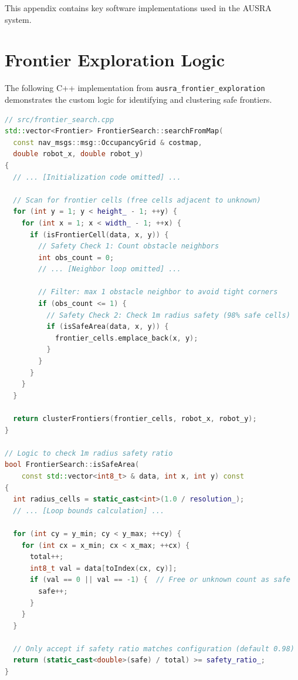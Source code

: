 This appendix contains key software implementations used in the AUSRA system.

\section{Frontier Exploration Logic}
\label{code:frontier_api}

The following C++ implementation from \texttt{ausra\_frontier\_exploration} demonstrates the custom logic for identifying and clustering safe frontiers.

\begin{lstlisting}[language=C++, caption={Frontier Search and Safety Filtering}]
// src/frontier_search.cpp
std::vector<Frontier> FrontierSearch::searchFromMap(
  const nav_msgs::msg::OccupancyGrid & costmap,
  double robot_x, double robot_y)
{
  // ... [Initialization code omitted] ...

  // Scan for frontier cells (free cells adjacent to unknown)
  for (int y = 1; y < height_ - 1; ++y) {
    for (int x = 1; x < width_ - 1; ++x) {
      if (isFrontierCell(data, x, y)) {
        // Safety Check 1: Count obstacle neighbors
        int obs_count = 0;
        // ... [Neighbor loop omitted] ...
        
        // Filter: max 1 obstacle neighbor to avoid tight corners
        if (obs_count <= 1) {
          // Safety Check 2: Check 1m radius safety (98% safe cells)
          if (isSafeArea(data, x, y)) {
            frontier_cells.emplace_back(x, y);
          }
        }
      }
    }
  }

  return clusterFrontiers(frontier_cells, robot_x, robot_y);
}

// Logic to check 1m radius safety ratio
bool FrontierSearch::isSafeArea(
    const std::vector<int8_t> & data, int x, int y) const
{
  int radius_cells = static_cast<int>(1.0 / resolution_);
  // ... [Loop bounds calculation] ...
  
  for (int cy = y_min; cy < y_max; ++cy) {
    for (int cx = x_min; cx < x_max; ++cx) {
      total++;
      int8_t val = data[toIndex(cx, cy)];
      if (val == 0 || val == -1) {  // Free or unknown count as safe
        safe++;
      }
    }
  }
  
  // Only accept if safety ratio matches configuration (default 0.98)
  return (static_cast<double>(safe) / total) >= safety_ratio_;
}
\end{lstlisting}

